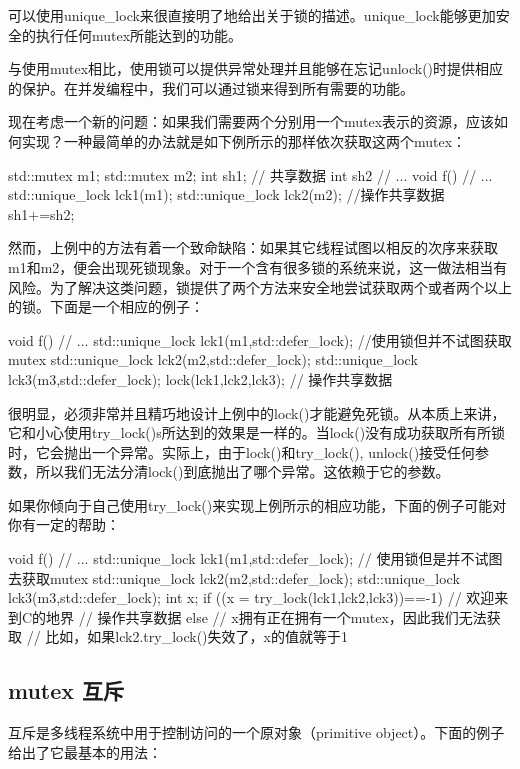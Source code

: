 可以使用unique_lock来很直接明了地给出关于锁的描述。unique_lock能够更加安全的执行任何mutex所能达到的功能。

与使用mutex相比，使用锁可以提供异常处理并且能够在忘记unlock()时提供相应的保护。在并发编程中，我们可以通过锁来得到所有需要的功能。

现在考虑一个新的问题：如果我们需要两个分别用一个mutex表示的资源，应该如何实现？一种最简单的办法就是如下例所示的那样依次获取这两个mutex：

\begin{Code}
	std::mutex m1;
	std::mutex m2;
	int sh1; // 共享数据
	int sh2
	// ...
	void f(){
		// ...
		std::unique_lock lck1(m1);
		std::unique_lock lck2(m2);
		//操作共享数据
		sh1+=sh2;
	}
\end{Code}

然而，上例中的方法有着一个致命缺陷：如果其它线程试图以相反的次序来获取m1和m2，便会出现死锁现象。对于一个含有很多锁的系统来说，这一做法相当有风险。为了解决这类问题，锁提供了两个方法来安全地尝试获取两个或者两个以上的锁。下面是一个相应的例子：

\begin{Code}
	void f(){
		// ...
		std::unique_lock lck1(m1,std::defer_lock); //使用锁但并不试图获取mutex
		std::unique_lock lck2(m2,std::defer_lock);
		std::unique_lock lck3(m3,std::defer_lock);
		lock(lck1,lck2,lck3);
		// 操作共享数据
	}
\end{Code}

很明显，必须非常并且精巧地设计上例中的lock()才能避免死锁。从本质上来讲，它和小心使用try_lock()s所达到的效果是一样的。当lock()没有成功获取所有所锁时，它会抛出一个异常。实际上，由于lock()和try_lock(), unlock()接受任何参数，所以我们无法分清lock()到底抛出了哪个异常。这依赖于它的参数。

如果你倾向于自己使用try_lock()来实现上例所示的相应功能，下面的例子可能对你有一定的帮助：

\begin{Code}
	void f(){
		// ...
		std::unique_lock lck1(m1,std::defer_lock); // 使用锁但是并不试图去获取mutex
		std::unique_lock lck2(m2,std::defer_lock);
		std::unique_lock lck3(m3,std::defer_lock);
		int x;
		if ((x = try_lock(lck1,lck2,lck3))==-1) { // 欢迎来到C的地界
			// 操作共享数据
		}
		else {
			// x拥有正在拥有一个mutex，因此我们无法获取
			// 比如，如果lck2.try_lock()失效了，x的值就等于1
		}
	}
\end{Code}

\subsection{mutex 互斥}
互斥是多线程系统中用于控制访问的一个原对象（primitive object）。下面的例子给出了它最基本的用法：

